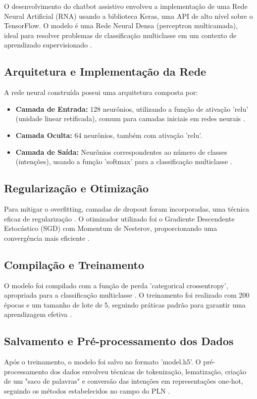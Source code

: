 \documentclass[conference]{IEEEtran}
\begin{document}
O desenvolvimento do chatbot assistivo envolveu a implementação de uma Rede Neural Artificial (RNA) 
usando a biblioteca Keras, uma API de alto nível sobre o TensorFlow. 
O modelo é uma Rede Neural Densa (perceptron multicamada), 
ideal para resolver problemas de classificação multiclasse em um contexto 
de aprendizado supervisionado \cite{Chollet2017}.

\subsection{Arquitetura e Implementação da Rede}
A rede neural construída possui uma arquitetura composta por:

\begin{itemize}
\item \textbf{Camada de Entrada:} 128 neurônios, utilizando a função de ativação 'relu' (unidade linear retificada), 
comum para camadas iniciais em redes neurais \cite{Goodfellow2016}.
\item \textbf{Camada Oculta:} 64 neurônios, também com ativação 'relu'.
\item \textbf{Camada de Saída:} Neurônios correspondentes ao número de classes (intenções), 
usando a função 'softmax' para a classificação multiclasse \cite{Bishop2006}.
\end{itemize}

\subsection{Regularização e Otimização}
Para mitigar o overfitting, camadas de dropout foram incorporadas, uma técnica eficaz de regularização \cite{Srivastava2014}. 
O otimizador utilizado foi o Gradiente Descendente Estocástico (SGD) com Momentum de Nesterov, 
proporcionando uma convergência mais eficiente \cite{Sutskever2013}.

\subsection{Compilação e Treinamento}
O modelo foi compilado com a função de perda 'categorical crossentropy', 
apropriada para a classificação multiclasse \cite{Goodfellow2016}. 
O treinamento foi realizado com 200 épocas e um tamanho de lote de 5, 
seguindo práticas padrão para garantir uma aprendizagem efetiva \cite{Bengio2012}.

\subsection{Salvamento e Pré-processamento dos Dados}
Após o treinamento, o modelo foi salvo no formato 'model.h5'. 
O pré-processamento dos dados envolveu técnicas de tokenização, lematização, criação de um "saco de palavras" e 
conversão das intenções em representações one-hot, 
seguindo os métodos estabelecidos no campo do PLN \cite{Manning1999}.
\end{document}
